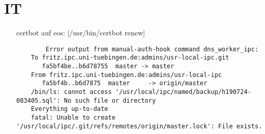 \documentclass[letterpaper,11pt]{article}
\begin{document}
\section*{IT}
\begin{itemize}
	\item[certbot] auf eos: |/usr/bin/certbot renew|
	\begin{verbatim}
	    Error output from manual-auth-hook command dns_worker_ipc:
    To fritz.ipc.uni-tuebingen.de:admins/usr-local-ipc.git                                                                                                                                                             
       fa5bf4be..b6d78755  master -> master                                                                                                                                                                            
    From fritz.ipc.uni-tuebingen.de:admins/usr-local-ipc                                                                                                                                                               
       fa5bf4b..b6d7875  master     -> origin/master                                                                                                                                                                   
    /bin/ls: cannot access '/usr/local/ipc/named/backup/h190724-083405.sql': No such file or directory                                                                                                                 
    Everything up-to-date                                                                                                                                                                                              
    fatal: Unable to create '/usr/local/ipc/.git/refs/remotes/origin/master.lock': File exists.                                                                                                                        


\end{verbatim}
\end{itemize}
\end{document}
